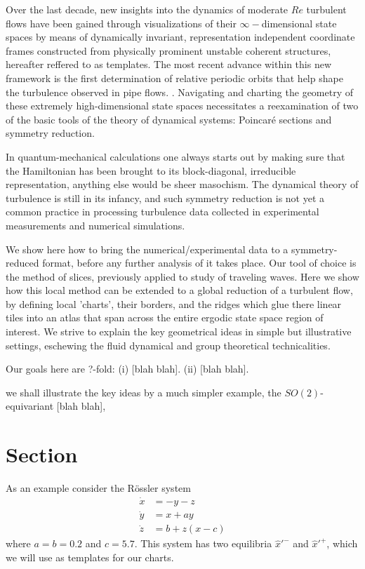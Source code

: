 \documentclass{article}
\begin{document}
Over the last decade, new insights into the dynamics of moderate $Re$
turbulent flows have been gained through visualizations of their
$\infty-$dimensional state spaces by means of dynamically invariant,
representation independent coordinate frames constructed from physically
prominent unstable coherent structures, hereafter reffered to as
templates. The most recent advance within this new framework is the first
determination of relative periodic orbits that help shape the turbulence
observed in pipe flows. \cite{ACHKW11}. Navigating and charting the
geometry of these extremely high-dimensional state spaces necessitates a
reexamination of two of the basic tools of the theory of dynamical
systems: Poincar\'e sections and symmetry reduction.

In quantum-mechanical calculations one always starts out by making sure
that the Hamiltonian has been brought to its block-diagonal, irreducible
representation, anything else would be sheer masochism. The dynamical
theory of turbulence is still in its infancy, and such symmetry reduction
is not yet a common practice in processing turbulence data collected in
experimental measurements and numerical simulations.

We show here how to bring the numerical/experimental data to a
symmetry-reduced format, before any further analysis of it takes place.
Our tool of choice is the method of slices,
\cite{rowley_reconstruction_2000,BeTh04,SiCvi10,FrCv11} previously
applied to study of traveling waves. Here we show how this local method
can be extended to a global reduction of a turbulent flow, by defining
local 'charts', their borders, and the ridges which glue there linear
tiles into an atlas that span across the entire ergodic state space
region of interest. We strive to explain the key geometrical ideas in
simple but illustrative settings, eschewing the fluid dynamical and group
theoretical technicalities.

Our goals here are ?-fold:
(i)  [blah blah].
(ii) [blah blah].

we shall illustrate the key ideas by a much
simpler example, the $SO(2)$-equivariant  [blah blah],

\section{Section}
\label{s:cut}


As an example consider the R\"ossler system
\begin{align}
\dot{x}&=-y-z\\
\dot{y}&=x+ay\\
\dot{z}&=b+z(x-c)
\end{align}
where $a=b=0.2$ and $c=5.7$. This system has two equilibria
$\hat{x}'^{-}$ and $\hat{x}'^{+}$, which we will use as templates for our
charts.
\end{document}
